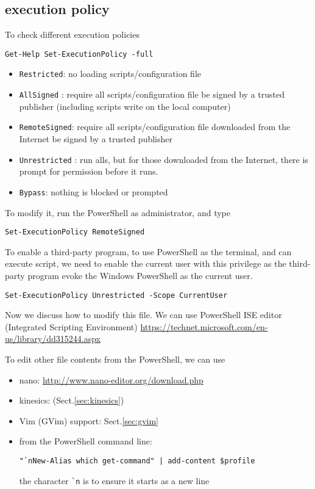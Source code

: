\subsection{execution policy}
\label{sec:execution_policy_PowerShell}

To check different execution policies
\begin{verbatim}
Get-Help Set-ExecutionPolicy -full
\end{verbatim}
\begin{itemize}
  \item \verb!Restricted!: no loading scripts/configuration file
  \item \verb!AllSigned! : require all scripts/configuration file be signed by a
  trusted publisher (including scripts write on the local computer)
  
  \item \verb!RemoteSigned!: require all scripts/configuration file downloaded
  from the Internet be signed by a trusted publisher
  
  \item \verb!Unrestricted! : run alls, but for those downloaded from the
  Internet, there is prompt for permission before it runs.
  
  \item \verb!Bypass!: nothing is blocked or prompted 
  
\end{itemize}

To modify it, run the PowerShell as administrator, and type
\begin{verbatim}
Set-ExecutionPolicy RemoteSigned
\end{verbatim}

To enable a third-party program, to use PowerShell as the terminal, and can execute script, we need to enable the current user with this privilege
as the third-party program evoke the Windows PowerShell as the current user.
\begin{verbatim}
Set-ExecutionPolicy Unrestricted -Scope CurrentUser
\end{verbatim}

Now we discuss how to modify this file. We can use PowerShell ISE editor
(Integrated Scripting Environment)
\url{https://technet.microsoft.com/en-us/library/dd315244.aspx}

To edit other file contents from the PowerShell, we can use
\begin{itemize}
  \item nano: \url{http://www.nano-editor.org/download.php}
  
  \item kinesics: (Sect.\ref{sec:kinesics})
  
  \item Vim (GVim) support: Sect.\ref{sec:gvim}
  
  \item from the PowerShell command line:
  
\begin{verbatim}
"`nNew-Alias which get-command" | add-content $profile
\end{verbatim}
the character \verb!`n! is to ensure it starts as a new line
\end{itemize} 

